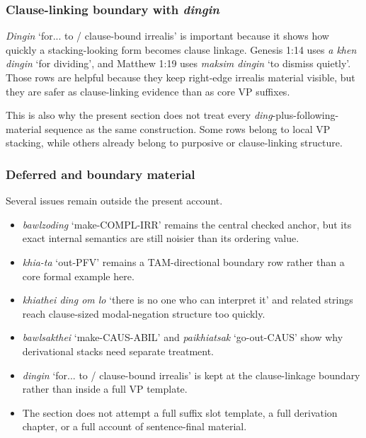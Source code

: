 \documentclass[
  11pt,
  a4paper,
]{article}
\providecommand{\tightlist}{%
  \setlength{\itemsep}{0pt}\setlength{\parskip}{0pt}}
\newcommand{\tdim}[1]{\textit{#1}}
\newcommand{\glossquote}[1]{`#1'}
\begin{document}
\subsubsection{\texorpdfstring{Clause-linking boundary with
\tdim{dingin}}{Clause-linking boundary with }}\label{clause-linking-boundary-with}

\tdim{Dingin} \glossquote{for... to / clause-bound irrealis} is
important because it shows how quickly a stacking-looking form becomes
clause linkage. Genesis 1:14 uses \tdim{a khen dingin}
\glossquote{for dividing}, and Matthew 1:19 uses \tdim{maksim dingin}
\glossquote{to dismiss quietly}. Those rows are helpful because they
keep right-edge irrealis material visible, but they are safer as
clause-linking evidence than as core VP suffixes.

This is also why the present section does not treat every
\tdim{ding}-plus-following-material sequence as the same construction.
Some rows belong to local VP stacking, while others already belong to
purposive or clause-linking structure.

\subsubsection{Deferred and boundary
material}\label{deferred-and-boundary-material-4}

Several issues remain outside the present account.

\begin{itemize}
\tightlist
\item
  \tdim{bawlzoding} \glossquote{make-COMPL-IRR} remains the central
  checked anchor, but its exact internal semantics are still noisier
  than its ordering value.
\item
  \tdim{khia-ta} \glossquote{out-PFV} remains a TAM-directional boundary
  row rather than a core formal example here.
\item
  \tdim{khiathei ding om lo}
  \glossquote{there is no one who can interpret it} and related strings
  reach clause-sized modal-negation structure too quickly.
\item
  \tdim{bawlsakthei} \glossquote{make-CAUS-ABIL} and \tdim{paikhiatsak}
  \glossquote{go-out-CAUS} show why derivational stacks need separate
  treatment.
\item
  \tdim{dingin} \glossquote{for... to / clause-bound irrealis} is kept
  at the clause-linkage boundary rather than inside a full VP template.
\item
  The section does not attempt a full suffix slot template, a full
  derivation chapter, or a full account of sentence-final material.
\end{itemize}
\end{document}
